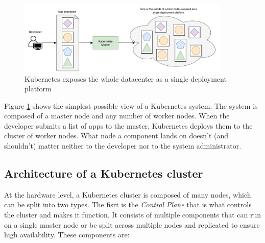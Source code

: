 \begin{figure}[htbp]
	\centering
	\includegraphics[width=0.9\textwidth]{images/kubernetesmain.pdf}
	\caption{Kubernetes exposes the whole datacenter as a single deployment platform}
	\label{fig:kubernetesmain}
\end{figure}

Figure \ref{fig:kubernetesmain} shows the simplest possible view of a Kubernetes system. The system is composed of a master node and any number of worker nodes. When the developer submits a list of apps to the master, Kubernetes deploys them to the cluster of worker nodes. What node a component lands on doesn't (and shouldn't) matter neither to the developer nor to the system administrator.

\subsection{Architecture of a Kubernetes cluster}
At the hardware level, a Kubernetes cluster is composed of many nodes, which can be split into two types. 
The fisrt is the \textit{Control Plane} that is what controls the cluster and makes it function. It consists of multiple components that can run on a single master node or be split across multiple nodes and replicated to ensure high availability. These components are:

